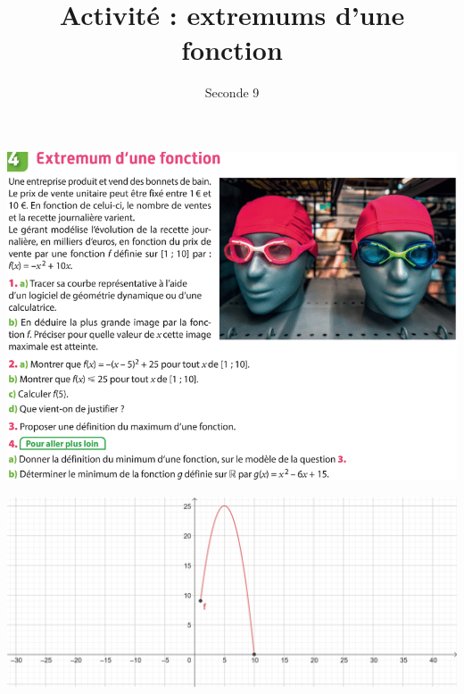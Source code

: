 \documentclass{article}
\title{Activité : extremums d'une fonction}
\author{Seconde 9}
\date{}
\begin{document}
\maketitle

\begin{center}
\includegraphics[width=\textwidth]{Activite.png}

\vspace*{0.5cm}
\includegraphics[width=\textwidth]{Fonction.png}

\end{center}
\end{document}
